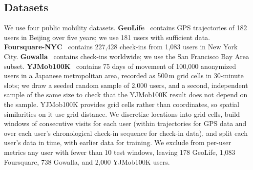 \documentclass[sigconf,anonymous,review]{acmart}
\begin{document}
\subsection{Datasets}
We use four public mobility datasets. \textbf{GeoLife}~\cite{zheng2010geolife,zheng2011geolifeguide} contains GPS trajectories of 182 users in Beijing over five years; we use 181 users with sufficient data. \textbf{Foursquare-NYC}~\cite{yang2015foursquare} contains 227{,}428 check-ins from 1{,}083 users in New York City. \textbf{Gowalla}~\cite{cho2011gowalla} contains check-ins worldwide; we use the San Francisco Bay Area subset. \textbf{YJMob100K}~\cite{yabe2024yjmob} contains 75 days of movement of 100{,}000 anonymized users in a Japanese metropolitan area, recorded as 500\,m grid cells in 30-minute slots; we draw a seeded random sample of 2{,}000 users, and a second, independent sample of the same size to check that the YJMob100K result does not depend on the sample. YJMob100K provides grid cells rather than coordinates, so spatial similarities on it use grid distance. We discretize locations into grid cells, build windows of consecutive visits for each user (within trajectories for GPS data and over each user's chronological check-in sequence for check-in data), and split each user's data in time, with earlier data for training. We exclude from per-user metrics any user with fewer than 10 test windows, leaving 178 GeoLife, 1{,}083 Foursquare, 738 Gowalla, and 2{,}000 YJMob100K users.
\end{document}
